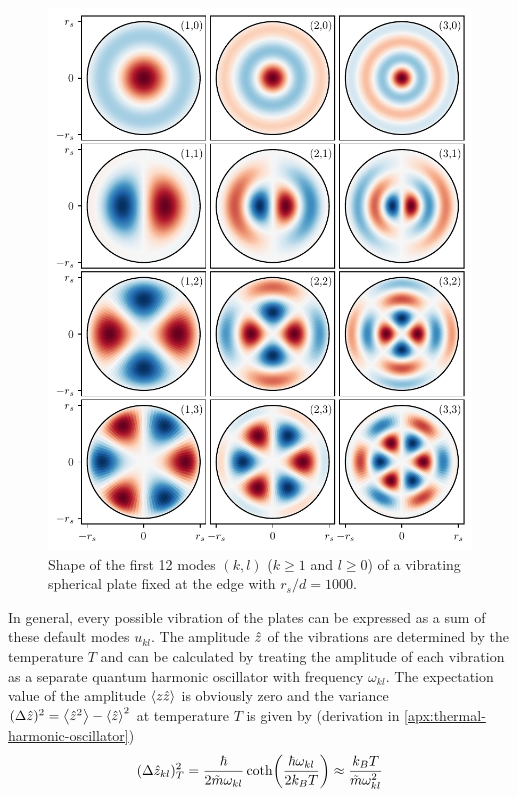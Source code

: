 \begin{figure}[!htbp]
  \centering
  \includegraphics[width=\textwidth]{./../figures/vibrations/vibrational-modes-rd_bu.pdf}
  \caption{Shape of the first 12 modes $(k,l)$ ($k \geq 1$ and $l \geq 0$) of a vibrating spherical plate fixed at the edge with $r_s/d = 1000$.}
  \label{fig:5:vibrational-modes}
\end{figure}
In general, every possible vibration of the plates can be expressed as a sum of these default modes $u_{kl}$.
The amplitude $\hat{z}$ of the vibrations are determined by the temperature $T$ and can be calculated by treating the amplitude of each vibration as a separate quantum harmonic oscillator with frequency $\omega_{kl}$.
The expectation value of the amplitude $\left\langle z\hat{z}\right\rangle$ is obviously zero and the variance $(\Delta \hat{z})^2 = \left\langle\hat{z}^2\right\rangle - \left\langle\hat{z}\right\rangle^2$ at temperature $T$ is given by (derivation in \cref{apx:thermal-harmonic-oscillator})
\begin{equation}\label{eq:5:amplitude-variance}
  (\Delta \hat{z}_{kl})^2_T = \frac{\hbar}{2\tilde{m}\omega_{kl}}\coth(\frac{\hbar \omega_{kl}}{2k_BT}) \approx \frac{k_B T}{\tilde{m}\omega_{kl}^2}
\end{equation}
